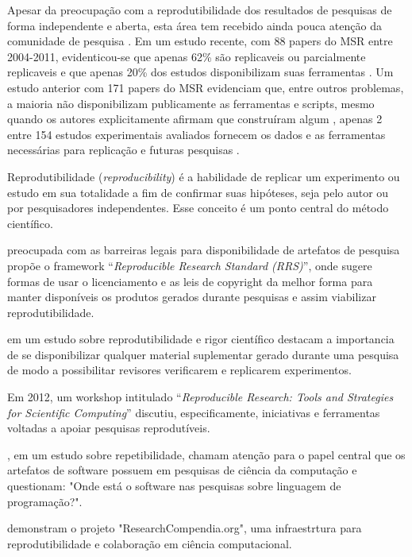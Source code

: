 Apesar da preocupação com a reprodutibilidade dos resultados de pesquisas de
forma independente \cite{stodden2009enabling} e aberta, esta área tem recebido ainda
pouca atenção da comunidade de pesquisa \cite{pontika_fostering_2015,grand_open_2010}. Em um
estudo recente, com 88 papers do MSR entre 2004-2011, evidenticou-se que apenas
62\% são replicaveis ou parcialmente replicaveis e que apenas 20\% dos estudos
disponibilizam suas ferramentas \cite{amann2015software}. Um estudo anterior
com 171 papers do MSR evidenciam que, entre outros problemas, a maioria não
disponibilizam publicamente as ferramentas e scripts, mesmo quando os autores
explicitamente afirmam que construíram algum \cite{robles2010replicating},
apenas 2 entre 154 estudos experimentais avaliados fornecem os dados e as
ferramentas necessárias para replicação e futuras pesquisas
\cite{barr_shoulders_2010}.

Reprodutibilidade ({\it reproducibility}) é a habilidade de replicar um
experimento ou estudo em sua totalidade a fim de confirmar suas hipóteses, seja
pelo autor ou por pesquisadores independentes. Esse conceito é um ponto central
do método científico.

 preocupada com as barreiras legais para
disponibilidade de artefatos de pesquisa propõe o framework ``{\it Reproducible
Research Standard (RRS)}'', onde sugere formas de usar o licenciamento e as leis
de copyright da melhor forma para manter disponíveis os produtos gerados
durante pesquisas e assim viabilizar reprodutibilidade.

em um estudo sobre reprodutibilidade e rigor científico destacam a importancia
de se disponibilizar qualquer material suplementar gerado durante uma pesquisa
de modo a possibilitar revisores verificarem e replicarem experimentos.

Em
2012, um workshop intitulado ``{\it Reproducible Research: Tools and Strategies for
Scientific Computing}'' \cite{stodden_reproducible_2012} discutiu, especificamente, iniciativas
e ferramentas voltadas a apoiar pesquisas reprodutíveis.

, em um estudo sobre repetibilidade, chamam
atenção para o papel central que os artefatos de software possuem em pesquisas
de ciência da computação e questionam: "Onde está o software nas pesquisas
sobre linguagem de programação?".

 demonstram o
projeto "ResearchCompendia.org", uma infraestrtura para reprodutibilidade e
colaboração em ciência computacional.

